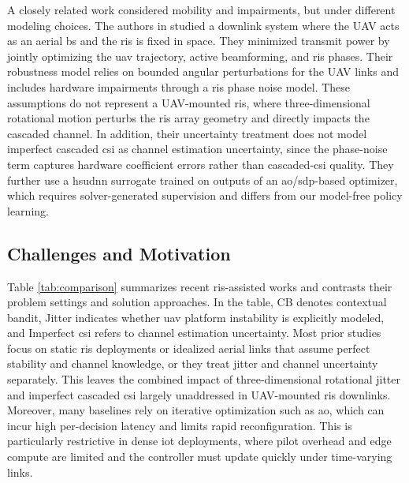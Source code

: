 A closely related work considered mobility and impairments, but under different modeling choices. The authors in \cite{adam2023intelligent} studied a downlink system where the UAV acts as an aerial \gls{bs} and the \gls{ris} is fixed in space. They minimized transmit power by jointly optimizing the \gls{uav} trajectory, active beamforming, and \gls{ris} phases. Their robustness model relies on bounded angular perturbations for the UAV links and includes hardware impairments through a \gls{ris} phase noise model. These assumptions do not represent a UAV-mounted \gls{ris}, where three-dimensional rotational motion perturbs the \gls{ris} array geometry and directly impacts the cascaded channel. In addition, their uncertainty treatment does not model imperfect cascaded \gls{csi} as channel estimation uncertainty, since the phase-noise term captures hardware coefficient errors rather than cascaded-\gls{csi} quality. They further use a \gls{hsudnn} surrogate trained on outputs of an \gls{ao}/\gls{sdp}-based optimizer, which requires solver-generated supervision and differs from our model-free policy learning.



\subsection{Challenges and Motivation}
Table \ref{tab:comparison} summarizes recent \gls{ris}-assisted works and contrasts their problem settings and solution approaches. In the table, CB denotes contextual bandit, Jitter indicates whether \gls{uav} platform instability is explicitly modeled, and Imperfect \gls{csi} refers to channel estimation uncertainty. Most prior studies focus on static \gls{ris} deployments or idealized aerial links that assume perfect stability and channel knowledge, or they treat jitter and channel uncertainty separately. This leaves the combined impact of three-dimensional rotational jitter and imperfect cascaded \gls{csi} largely unaddressed in UAV-mounted \gls{ris} downlinks. Moreover, many baselines rely on iterative optimization such as \gls{ao}, which can incur high per-decision latency and limits rapid reconfiguration. This is particularly restrictive in dense \gls{iot} deployments, where pilot overhead and edge compute are limited and the controller must update quickly under time-varying links.


